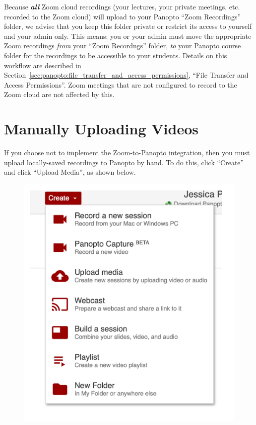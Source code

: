 \begin{important}
	Because \emph{\textbf{all}} Zoom cloud recordings (your lectures, your private meetings, etc. recorded to the Zoom cloud) will upload to your Panopto ``Zoom Recordings'' folder, we advise that you keep this folder private or restrict its access to yourself and your admin only. This means: you or your admin must move the appropriate Zoom recordings \emph{from} your ``Zoom Recordngs'' folder, \emph{to} your Panopto course folder for the recordings to be accessible to your students. Details on this workflow are described in Section~\ref{sec:panopto:file_transfer_and_access_permissions}, ``File Transfer and Access Permissions''. Zoom meetings that are not configured to record to the Zoom cloud are not affected by this.
\end{important}


\section{Manually Uploading Videos}
\label{sec:panopto:manually_uploading_videos}

If you choose not to implement the Zoom-to-Panopto integration, then you must upload locally-saved recordings to Panopto by hand. To do this, click ``Create'' and click ``Upload Media'', as shown below.

\begin{figure}[H]
	\centering
	\includegraphics[scale=0.6]{panopto/media/07-create.png}
\end{figure}


